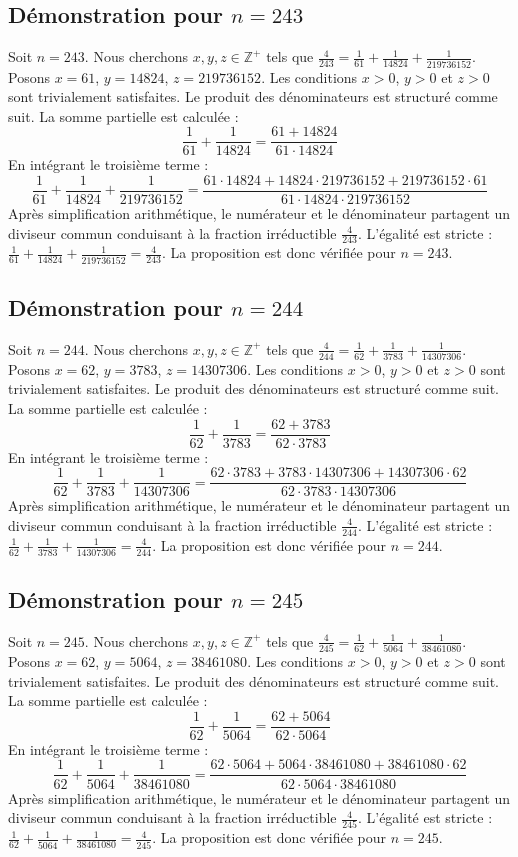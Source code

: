 \documentclass[11pt,a4paper]{article}
\begin{document}
\subsection{Démonstration pour $n = 243$}
Soit $n = 243$. Nous cherchons $x, y, z \in \mathbb{Z}^{+}$ tels que $\frac{4}{243} = \frac{1}{61} + \frac{1}{14824} + \frac{1}{219736152}$.
Posons $x = 61$, $y = 14824$, $z = 219736152$.
Les conditions $x > 0$, $y > 0$ et $z > 0$ sont trivialement satisfaites.
Le produit des dénominateurs est structuré comme suit. La somme partielle est calculée :
$$ \frac{1}{61} + \frac{1}{14824} = \frac{61+14824}{61 \cdot 14824} $$
En intégrant le troisième terme :
$$ \frac{1}{61} + \frac{1}{14824} + \frac{1}{219736152} = \frac{61 \cdot 14824 + 14824 \cdot 219736152 + 219736152 \cdot 61}{61 \cdot 14824 \cdot 219736152} $$
Après simplification arithmétique, le numérateur et le dénominateur partagent un diviseur commun conduisant à la fraction irréductible $\frac{4}{243}$.
L'égalité est stricte : $\frac{1}{61} + \frac{1}{14824} + \frac{1}{219736152} = \frac{4}{243}$.
La proposition est donc vérifiée pour $n = 243$.
\subsection{Démonstration pour $n = 244$}
Soit $n = 244$. Nous cherchons $x, y, z \in \mathbb{Z}^{+}$ tels que $\frac{4}{244} = \frac{1}{62} + \frac{1}{3783} + \frac{1}{14307306}$.
Posons $x = 62$, $y = 3783$, $z = 14307306$.
Les conditions $x > 0$, $y > 0$ et $z > 0$ sont trivialement satisfaites.
Le produit des dénominateurs est structuré comme suit. La somme partielle est calculée :
$$ \frac{1}{62} + \frac{1}{3783} = \frac{62+3783}{62 \cdot 3783} $$
En intégrant le troisième terme :
$$ \frac{1}{62} + \frac{1}{3783} + \frac{1}{14307306} = \frac{62 \cdot 3783 + 3783 \cdot 14307306 + 14307306 \cdot 62}{62 \cdot 3783 \cdot 14307306} $$
Après simplification arithmétique, le numérateur et le dénominateur partagent un diviseur commun conduisant à la fraction irréductible $\frac{4}{244}$.
L'égalité est stricte : $\frac{1}{62} + \frac{1}{3783} + \frac{1}{14307306} = \frac{4}{244}$.
La proposition est donc vérifiée pour $n = 244$.
\subsection{Démonstration pour $n = 245$}
Soit $n = 245$. Nous cherchons $x, y, z \in \mathbb{Z}^{+}$ tels que $\frac{4}{245} = \frac{1}{62} + \frac{1}{5064} + \frac{1}{38461080}$.
Posons $x = 62$, $y = 5064$, $z = 38461080$.
Les conditions $x > 0$, $y > 0$ et $z > 0$ sont trivialement satisfaites.
Le produit des dénominateurs est structuré comme suit. La somme partielle est calculée :
$$ \frac{1}{62} + \frac{1}{5064} = \frac{62+5064}{62 \cdot 5064} $$
En intégrant le troisième terme :
$$ \frac{1}{62} + \frac{1}{5064} + \frac{1}{38461080} = \frac{62 \cdot 5064 + 5064 \cdot 38461080 + 38461080 \cdot 62}{62 \cdot 5064 \cdot 38461080} $$
Après simplification arithmétique, le numérateur et le dénominateur partagent un diviseur commun conduisant à la fraction irréductible $\frac{4}{245}$.
L'égalité est stricte : $\frac{1}{62} + \frac{1}{5064} + \frac{1}{38461080} = \frac{4}{245}$.
La proposition est donc vérifiée pour $n = 245$.
\end{document}
